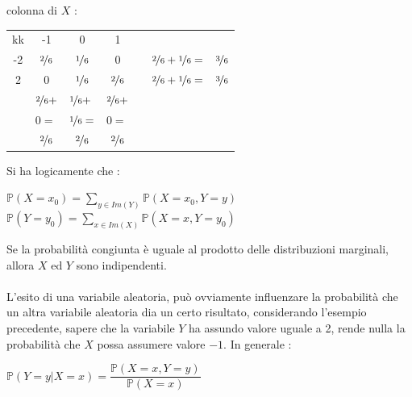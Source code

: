 \documentclass[12pt, letterpaper]{article}
\newcommand{\acc}{\\\hphantom{}\\}
\newcommand{\Prob}{{\mathbb P}}
\begin{document}
colonna di \(X\) : \begin{center}
    \begin{tabular}{lccclll}
        \cline{1-4}
        \multicolumn{1}{|c|}{\cellcolor[HTML]{C0C0C0}kk} & \multicolumn{1}{c|}{\cellcolor[HTML]{FD6864}-1} & \multicolumn{1}{c|}{\cellcolor[HTML]{FD6864}0} & \multicolumn{1}{c|}{\cellcolor[HTML]{FD6864}1} &  &                       &                          \\ \cline{1-4} \cline{7-7} 
        \multicolumn{1}{|c|}{\cellcolor[HTML]{9698ED}-2} & \multicolumn{1}{c|}{\(\nicefrac{2}{6}\)}                        & \multicolumn{1}{c|}{\(\nicefrac{1}{6}\)}                       & \multicolumn{1}{c|}{0}                         &  & \multicolumn{1}{l|}{\(\nicefrac{2}{6}+\nicefrac{1}{6}=\)} & \multicolumn{1}{c|}{\(\nicefrac{3}{6}\)} \\ \cline{1-4} \cline{7-7} 
        \multicolumn{1}{|c|}{\cellcolor[HTML]{9698ED}2}  & \multicolumn{1}{c|}{0}                          & \multicolumn{1}{c|}{\(\nicefrac{1}{6}\)}                       & \multicolumn{1}{c|}{\(\nicefrac{2}{6}\)}                       &  & \multicolumn{1}{l|}{\(\nicefrac{2}{6}+\nicefrac{1}{6}=\)} & \multicolumn{1}{c|}{\(\nicefrac{3}{6}\)} \\ \cline{1-4} \cline{7-7} 
                                                         & \multicolumn{1}{l}{\(\nicefrac{2}{6}+\)}                            & \multicolumn{1}{l}{\(\nicefrac{1}{6}+\)}                           & \multicolumn{1}{l}{\(\nicefrac{2}{6}+\)}                           &  &                       &                          \\
                                                         & \multicolumn{1}{l}{\(0=\)}                            & \multicolumn{1}{l}{\(\nicefrac{1}{6}=\)}                           & \multicolumn{1}{l}{\(0=\)}                           &  &                       &                          \\ \cline{2-4}
        \multicolumn{1}{l|}{}                            & \multicolumn{1}{c|}{\(\nicefrac{2}{6}\)}                        & \multicolumn{1}{c|}{\(\nicefrac{2}{6}\)}                       & \multicolumn{1}{c|}{\(\nicefrac{2}{6}\)}                       &  &                       &                          \\ \cline{2-4}
        \end{tabular}
\end{center}
Si ha logicamente che : \begin{center}
    \(\Prob(X=x_0)=\displaystyle\sum_{y\in Im(Y)}\Prob(X=x_0,Y=y)\)\hphantom{aaaa}
    \(\Prob(Y=y_0)=\displaystyle\sum_{x\in Im(X)}\Prob(X=x,Y=y_0)\)
\end{center}
Se la probabilità congiunta è uguale al prodotto delle distribuzioni marginali, allora \(X\) ed \(Y\) 
sono indipendenti. \acc L'esito di una variabile aleatoria, può ovviamente influenzare la probabilità che un altra 
variabile aleatoria dia un certo risultato, considerando l'esempio precedente, sapere che la variabile 
\(Y\) ha assundo valore uguale a 2, rende nulla la probabilità che \(X\) possa assumere valore \(-1\). 
In generale :\begin{center}
    \(\Prob(Y=y|X=x)=\dfrac{\Prob(X=x,Y=y)}{\Prob(X=x)}\)
\end{center}
\end{document}
